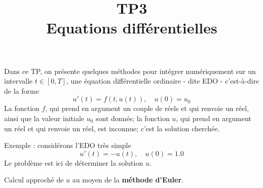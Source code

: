 \documentclass{exam}
\title{TP3\\ Equations différentielles}
\begin{document}
\maketitle


Dans ce TP, on présente quelques méthodes pour intégrer numériquement sur un intervalle $t \in [0, T]$, une équation différentielle ordinaire - dite EDO - c'est-à-dire de la forme
\begin{equation}
\label{edo_0}
u'(t) =  f(t, u(t)),\quad u(0) = u_0
\end{equation}
La fonction $f$, qui prend en argument un couple de réels et qui renvoie un réel, ainsi que la valeur initiale $u_0$ sont donnés; la fonction $u$, qui prend en argument un réel et qui renvoie un réel, est inconnue; c'est la solution cherchée.

\begin{questions}
\question
Exemple : considérons l'EDO très simple
\begin{equation}
\label{exemple_1}
u'(t) =  -u(t), \quad u(0)  =  1.0
\end{equation}
Le problème est ici de déterminer la solution $u$.

\question
Calcul approché de $u$ au moyen de la {\bf méthode d'Euler}.


\end{questions}
\end{document}
